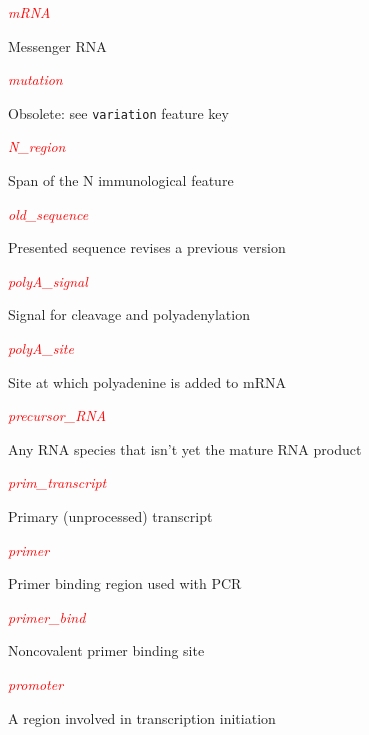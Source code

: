 \textcolor{red}{\textit{mRNA}}
\begin{adjustwidth}{1cm}{}
Messenger RNA
\end{adjustwidth}

\textcolor{red}{\textit{mutation}}
\begin{adjustwidth}{1cm}{}
Obsolete: see \verb|variation| feature key
\end{adjustwidth}

\textcolor{red}{\textit{N\_region}}
\begin{adjustwidth}{1cm}{}
Span of the N immunological feature
\end{adjustwidth}

\textcolor{red}{\textit{old\_sequence}}
\begin{adjustwidth}{1cm}{}
Presented sequence revises a previous version
\end{adjustwidth}

\textcolor{red}{\textit{polyA\_signal}}
\begin{adjustwidth}{1cm}{}
Signal for cleavage and polyadenylation
\end{adjustwidth}

\textcolor{red}{\textit{polyA\_site}}
\begin{adjustwidth}{1cm}{}
Site at which polyadenine is added to mRNA
\end{adjustwidth}

\textcolor{red}{\textit{precursor\_RNA}}
\begin{adjustwidth}{1cm}{}
Any RNA species that isn't yet the mature RNA product
\end{adjustwidth}

\textcolor{red}{\textit{prim\_transcript}}
\begin{adjustwidth}{1cm}{}
Primary (unprocessed) transcript
\end{adjustwidth}

\textcolor{red}{\textit{primer}}
\begin{adjustwidth}{1cm}{}
Primer binding region used with PCR
\end{adjustwidth}

\textcolor{red}{\textit{primer\_bind}}
\begin{adjustwidth}{1cm}{}
Noncovalent primer binding site
\end{adjustwidth}

\textcolor{red}{\textit{promoter}}
\begin{adjustwidth}{1cm}{}
A region involved in transcription initiation
\end{adjustwidth}


